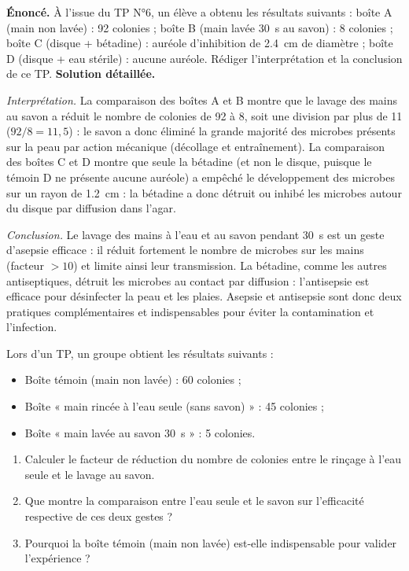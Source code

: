 \documentclass[11pt]{article}
\begin{document}
\begin{exoresolu}
\textbf{Énoncé.} À l'issue du TP N°6, un élève a obtenu les résultats suivants : boîte A (main non lavée) : \num{92} colonies ; boîte B (main lavée \SI{30}{\second} au savon) : \num{8} colonies ; boîte C (disque + bétadine) : auréole d'inhibition de \SI{2.4}{\centi\meter} de diamètre ; boîte D (disque + eau stérile) : aucune auréole. Rédiger l'interprétation et la conclusion de ce TP.
\tcblower
\textbf{Solution détaillée.}

\emph{Interprétation.} La comparaison des boîtes A et B montre que le lavage des mains au savon a réduit le nombre de colonies de \num{92} à \num{8}, soit une division par plus de 11 ($92/8 = 11,5$) : le savon a donc éliminé la grande majorité des microbes présents sur la peau par action mécanique (décollage et entraînement). La comparaison des boîtes C et D montre que seule la bétadine (et non le disque, puisque le témoin D ne présente aucune auréole) a empêché le développement des microbes sur un rayon de \SI{1.2}{\centi\meter} : la bétadine a donc détruit ou inhibé les microbes autour du disque par diffusion dans l'agar.

\emph{Conclusion.} Le lavage des mains à l'eau et au savon pendant \SI{30}{\second} est un geste d'asepsie efficace : il réduit fortement le nombre de microbes sur les mains (facteur $>10$) et limite ainsi leur transmission. La bétadine, comme les autres antiseptiques, détruit les microbes au contact par diffusion : l'antisepsie est efficace pour désinfecter la peau et les plaies. Asepsie et antisepsie sont donc deux pratiques complémentaires et indispensables pour éviter la contamination et l'infection.
\end{exoresolu}

\begin{exercice}
Lors d'un TP, un groupe obtient les résultats suivants :
\begin{itemize}
\item Boîte témoin (main non lavée) : \num{60} colonies ;
\item Boîte « main rincée à l'eau seule (sans savon) » : \num{45} colonies ;
\item Boîte « main lavée au savon \SI{30}{\second} » : \num{5} colonies.
\end{itemize}
\begin{enumerate}
\item Calculer le facteur de réduction du nombre de colonies entre le rinçage à l'eau seule et le lavage au savon.
\item Que montre la comparaison entre l'eau seule et le savon sur l'efficacité respective de ces deux gestes ?
\item Pourquoi la boîte témoin (main non lavée) est-elle indispensable pour valider l'expérience ?
\end{enumerate}
\end{exercice}
\end{document}
